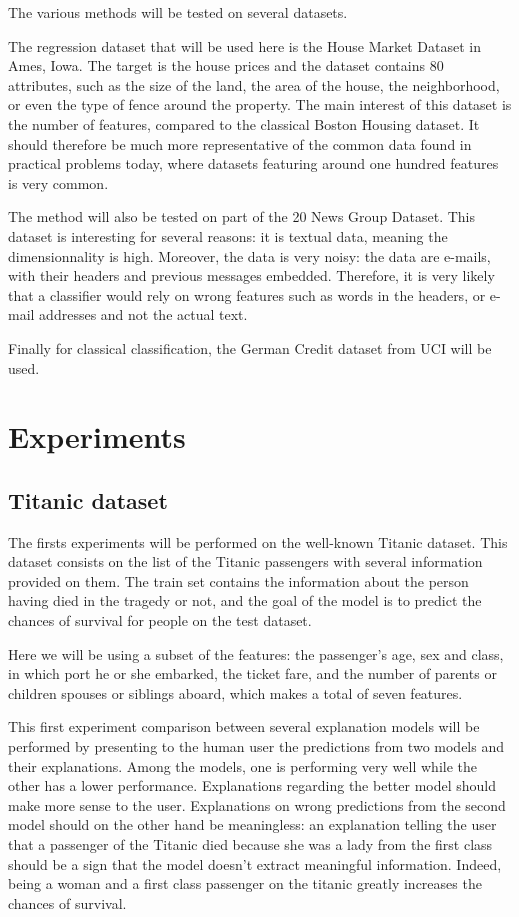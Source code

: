 \documentclass[a4paper,11pt]{kth-mag}
\begin{document}
The various methods will be tested on several datasets.

The regression dataset that will be used here is the House Market Dataset in Ames, Iowa. The target is the house prices and the dataset contains 80 attributes, such as the size of the land, the area of the house, the neighborhood, or even the type of fence around the property. The main interest of this dataset is the number of features, compared to the classical Boston Housing dataset. It should therefore be much more representative of the common data found in practical problems today, where datasets featuring around one hundred features is very common.

The method will also be tested on part of the 20 News Group Dataset. This dataset is interesting for several reasons: it is textual data, meaning the dimensionnality is high. Moreover, the data is very noisy: the data are e-mails, with their headers and previous messages embedded. Therefore, it is very likely that a classifier would rely on wrong features such as words in the headers, or e-mail addresses and not the actual text.

Finally for classical classification, the German Credit dataset from UCI will be used.


\chapter{Experiments}

\section{Titanic dataset}

The firsts experiments will be performed on the well-known Titanic dataset. This dataset consists on the list of the Titanic passengers with several information provided on them. The train set contains the information about the person having died in the tragedy or not, and the goal of the model is to predict the chances of survival for people on the test dataset.

Here we will be using a subset of the features: the passenger's age, sex and class, in which port he or she embarked, the ticket fare, and the number of parents or children spouses or siblings aboard, which makes a total of seven features.

This first experiment comparison between several explanation models will be performed by presenting to the human user the predictions from two models and their explanations. Among the models, one is performing very well while the other has a lower performance. Explanations regarding the better model should make more sense to the user. Explanations on wrong predictions from the second model should on the other hand be meaningless: an explanation telling the user that a passenger of the Titanic died because she was a lady from the first class should be a sign that the model doesn't extract meaningful information. Indeed, being a woman and a first class passenger on the titanic greatly increases the chances of survival.
\end{document}
